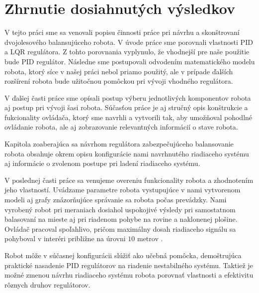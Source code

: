 \chapter{Zhrnutie dosiahnutých výsledkov}
V tejto práci sme sa venovali popisu činnosti práce pri návrhu a skonštrovaní dvojolesového balansujúceho robota. V úvode práce sme porovnali vlastnosti \ac{PID} a \ac{LQR} regulátora. Z tohto porovnania vyplynulo, že vhodnejší pre naše použitie bude PID regulátor. Následne sme postupovali odvodením matematického modelu robota, ktorý síce v našej práci nebol priamo použitý, ale v prípade ďalších rozšírení robota bude užitočnou pomôckou pri vývoji vhodného regulátora. 

V ďalšej časti práce sme opísali postup výberu jednotlivých komponentov robota aj postup pri vývoji šasi robota. Súčasťou práce je aj stručný opis konštrukcie a fukcionality ovládača, ktorý sme navrhli a vytvorili tak, aby umožňoval pohodlné ovládanie robota, ale aj zobrazovanie relevantných informácií o stave robota.

Kapitola zoaberajúca sa návrhom regulátora zabezpečujúceho balansovanie robota obsahuje okrem opisu konfigurácie nami navrhnutého riadiaceho systému aj informácie o zvolenom postupe pri ladení riadiaceho systému.  

V poslednej časti práce sa venujeme overeniu funkcionality robota a zhodnotením jeho vlastností. Uvádzame parametre robota vystupujúce v nami vytvorenom modeli aj grafy znázorňujúce správanie sa robota počas prevádzky. Nami vyrobený robot pri meraniach dosiahol uspokojivé výsledy pri samostatnom balasovaní na mieste aj pri riadenom pohybe na rovine a naklonenej plošine. Ovládač pracoval spoľahlivo, pričom maximálny dosah riadiaceho signálu sa pohyboval v interéri približne na úrovni $10$ metrov .

Robot môže v súčasnej konfigurácii slúžiť ako učebná pomôcka, demoštrujúca praktické nasadenie PID regulátorov na riadenie nestabilného systému. Taktiež je možné zmenou návrhu riadiaceho systému robota porovnať vlastnosti a efektivitu rôznych druhov regulátorov.


